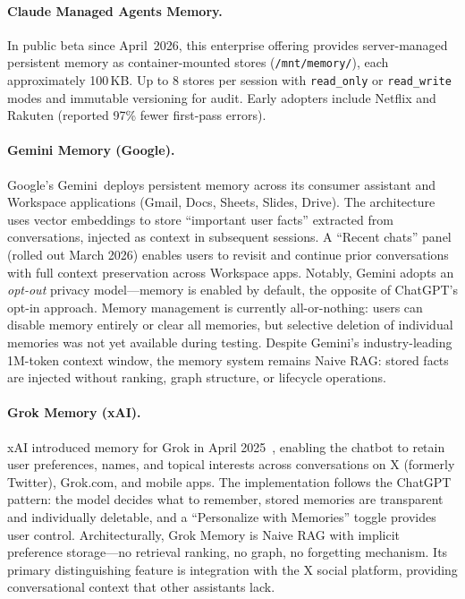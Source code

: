 \paragraph{Claude Managed Agents Memory.}
In public beta since April~2026\evV, this enterprise offering
provides server-managed persistent memory as container-mounted
stores (\texttt{/mnt/memory/}), each approximately 100\,KB. Up to 8
stores per session with \texttt{read\_only} or \texttt{read\_write}
modes and immutable versioning for audit. Early adopters include
Netflix and Rakuten (reported 97\% fewer first-pass errors)\evV.

\paragraph{Gemini Memory (Google).}
Google's Gemini~\cite{gemini2026memory}\evV deploys persistent memory across
its consumer assistant and Workspace applications (Gmail, Docs, Sheets,
Slides, Drive).  The architecture uses vector embeddings to store
``important user facts'' extracted from conversations, injected as
context in subsequent sessions\evV.  A ``Recent chats'' panel (rolled out
March 2026) enables users to revisit and continue prior conversations
with full context preservation across Workspace apps\evV.  Notably, Gemini
adopts an \emph{opt-out} privacy model\evV---memory is enabled by default,
the opposite of ChatGPT's opt-in approach.  Memory management is
currently all-or-nothing: users can disable memory entirely or clear
all memories, but selective deletion of individual memories was not
yet available during testing\evI.  Despite Gemini's industry-leading 1M-token
context window, the memory system remains Naive RAG\evI: stored facts are
injected without ranking, graph structure, or lifecycle operations.

\paragraph{Grok Memory (xAI).}
xAI introduced memory for Grok in April 2025~\cite{grok2025memory}\evV,
enabling the chatbot to retain user preferences, names, and topical
interests across conversations on X (formerly Twitter), Grok.com, and
mobile apps\evV.  The implementation follows the ChatGPT pattern: the model
decides what to remember, stored memories are transparent and
individually deletable, and a ``Personalize with Memories'' toggle
provides user control\evV.  Architecturally, Grok Memory is Naive RAG with
implicit preference storage---no retrieval ranking, no graph, no
forgetting mechanism\evI.  Its primary distinguishing feature is integration
with the X social platform, providing conversational context that other
assistants lack.

